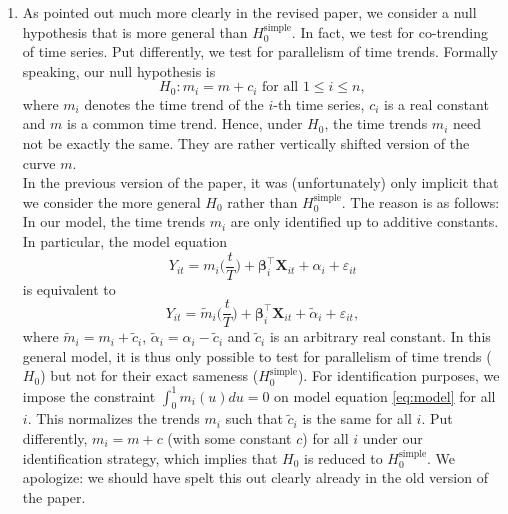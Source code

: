 \documentclass[a4paper,12pt]{article}
\begin{document}
\begin{enumerate}[label=\arabic*.,leftmargin=0.6cm]
\begin{enumerate}[leftmargin=0.7cm]
\item As pointed out much more clearly in the revised paper, we consider a null hypothesis that is more general than $H_0^{\text{simple}}$. In fact, we test for co-trending of time series.  Put differently, we test for parallelism of time trends. Formally speaking, our null hypothesis is
\[ H_0: m_i = m + c_i \text{ for all } 1 \le i \le n, \]
where $m_i$ denotes the time trend of the $i$-th time series, $c_i$ is a real constant and $m$ is a common time trend. Hence, under $H_0$, the time trends $m_i$ need not be exactly the same. They are rather vertically shifted version of the curve $m$. \\
In the previous version of the paper, it was (unfortunately) only implicit that we consider the more general $H_0$ rather than $H_0^{\text{simple}}$. The reason is as follows: In our model, the time trends $m_i$ are only identified up to additive constants. In particular, the model equation 
\begin{equation}\label{eq:model}
Y_{it} = m_i\Big(\frac{t}{T}\Big) + \boldsymbol{\beta}_i^\top \boldsymbol{X}_{it} + \alpha_i + \varepsilon_{it} 
\end{equation}  
is equivalent to
\[ Y_{it} = \tilde{m}_i\Big(\frac{t}{T}\Big) + \boldsymbol{\beta}_i^\top \boldsymbol{X}_{it} + \tilde{\alpha}_i + \varepsilon_{it}, \]
where $\tilde{m}_i = m_i + \tilde{c}_i$, $\tilde{\alpha}_i = \alpha_i - \tilde{c}_i$ and $\tilde{c}_i$ is an arbitrary real constant. In this general model, it is thus only possible to test for parallelism of time trends ($H_0$) but not for their exact sameness ($H_0^{\text{simple}}$). For identification purposes, we impose the constraint $\int_0^1 m_i(u) du = 0$ on model equation \eqref{eq:model} for all $i$. This normalizes the trends $m_i$ such that $\tilde{c}_i$ is the same for all $i$. Put differently, $m_i = m + c$ (with some constant $c$) for all $i$ under our identification strategy, which implies that $H_0$ is reduced to $H_0^{\text{simple}}$. We apologize: we should have spelt this out clearly already in the old version of the paper. 


\end{enumerate}
\end{enumerate}
\end{document}
